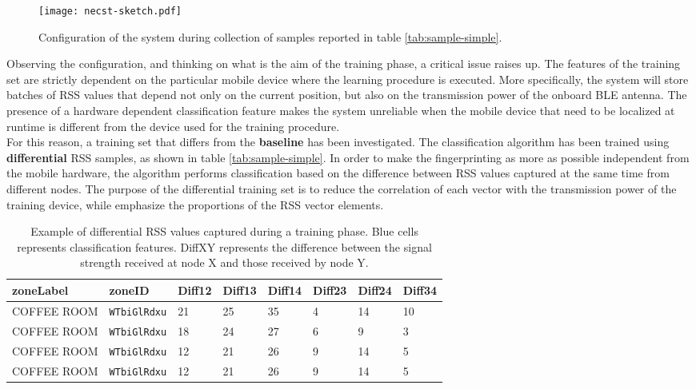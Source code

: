 \begin{figure}[h!tb]
\centering
\texttt{[image: necst-sketch.pdf]}
\caption[Configuration of the system during collection of samples reported in table \ref{tab:sample-simple}.]{Configuration of the system during collection of samples reported in table \ref{tab:sample-simple}.}
\label{fig:necst-sketch}
\end{figure}


Observing the configuration, and thinking on what is the aim of the training phase, a critical issue raises up. The features of the training set are strictly dependent on the particular mobile device where the learning procedure is executed. More specifically, the system will store batches of RSS values that depend not only on the current position, but also on the transmission power of the onboard BLE antenna.
The presence of a hardware dependent classification feature makes the system unreliable when the mobile device that need to be localized at runtime is different from the device used for the training procedure.\\
For this reason, a training set that differs from the \textbf{baseline} has been investigated. The classification algorithm has been trained using \textbf{differential} RSS samples, as shown in table \ref{tab:sample-simple}. In order to make the fingerprinting as more as possible independent from the mobile hardware, the algorithm performs classification based on the difference between RSS values captured at the same time from different nodes. 
The purpose of the differential training set is to reduce the correlation of each vector with the transmission power of the training device, while emphasize the proportions of the RSS vector elements.

\begin{table}[h!tb]
\caption[Example of differential RSS values captured during a training phase.]{Example of differential RSS values captured during a training phase. Blue cells represents classification features. DiffXY represents the difference between the signal strength received at node X and those received by node Y.}
\label{tab:sample-diff}
\begin{center}
\setlength{\tabcolsep}{.35em}
  \begin{tabularx}{\textwidth}{ | Y | a | a | a | a | a | a | a |}
    \hline
    zoneLabel & zoneID & Diff12 & Diff13 & Diff14 & Diff23 & Diff24 & Diff34\\ \hline
    COFFEE ROOM & \verb|WTbiGlRdxu| & 21 & 25 & 35 & 4 & 14 & 10\\
    COFFEE ROOM & \verb|WTbiGlRdxu| & 18 & 24 & 27 & 6 & 9 & 3\\
    COFFEE ROOM & \verb|WTbiGlRdxu| & 12 & 21 & 26 & 9 & 14 & 5\\
    COFFEE ROOM & \verb|WTbiGlRdxu| & 12 & 21 & 26 & 9 & 14 & 5\\
    \hline
  \end{tabularx}
\end{center}
\end{table}

